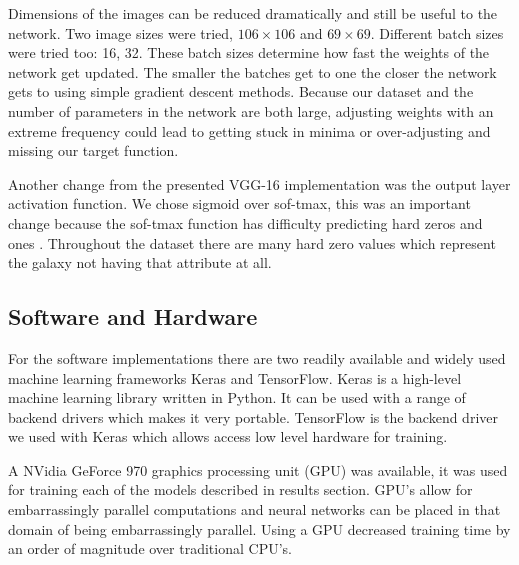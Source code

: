 Dimensions of the images can be reduced dramatically and still be useful to the network. Two image sizes were tried, $106 \times 106$ and $69 \times 69$. Different batch sizes were tried too: 16, 32. These batch sizes determine how fast the weights of the network get updated. The smaller the batches get to one the closer the network gets to using simple gradient descent methods. Because our dataset and the number of parameters in the network are both large, adjusting weights with an extreme frequency could lead to getting stuck in minima or over-adjusting and missing our target function.

Another change from the presented VGG-16 implementation was the output layer activation function. We chose sigmoid over sof-tmax, this was an important change because the sof-tmax function has difficulty predicting hard zeros and ones \cite{kaggle-winner}. Throughout the dataset there are many hard zero values which represent the galaxy not having that attribute at all.

\subsection{Software and Hardware}\label{hard-soft-ware}
For the software implementations there are two readily available and widely used machine learning frameworks Keras and TensorFlow. Keras is a high-level machine learning library written in Python. It can be used with a range of backend drivers which makes it very portable. TensorFlow is the backend driver we used with Keras which allows access low level hardware for training.

A NVidia GeForce 970 graphics processing unit (GPU) was available, it was used for training each of the models described in results section. GPU's allow for embarrassingly parallel computations and neural networks can be placed in that domain of being embarrassingly parallel. Using a GPU decreased training time by an order of magnitude over traditional CPU's.
